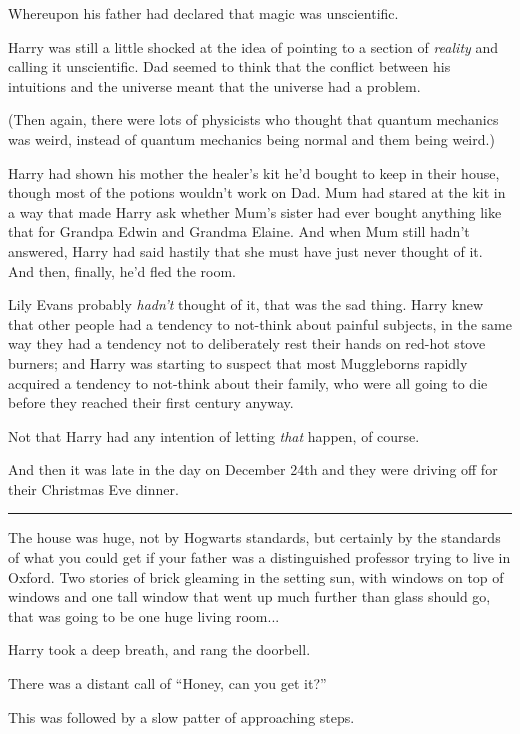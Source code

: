 Whereupon his father had declared that magic was unscientific.

Harry was still a little shocked at the idea of pointing to a section of \emph{reality} and calling it unscientific. Dad seemed to think that the conflict between his intuitions and the universe meant that the universe had a problem.

(Then again, there were lots of physicists who thought that quantum mechanics was weird, instead of quantum mechanics being normal and them being weird.)

Harry had shown his mother the healer's kit he'd bought to keep in their house, though most of the potions wouldn't work on Dad. Mum had stared at the kit in a way that made Harry ask whether Mum's sister had ever bought anything like that for Grandpa Edwin and Grandma Elaine. And when Mum still hadn't answered, Harry had said hastily that she must have just never thought of it. And then, finally, he'd fled the room.

Lily Evans probably \emph{hadn't} thought of it, that was the sad thing. Harry knew that other people had a tendency to not-think about painful subjects, in the same way they had a tendency not to deliberately rest their hands on red-hot stove burners; and Harry was starting to suspect that most Muggleborns rapidly acquired a tendency to not-think about their family, who were all going to die before they reached their first century anyway.

Not that Harry had any intention of letting \emph{that} happen, of course.

And then it was late in the day on December 24th and they were driving off for their Christmas Eve dinner.

\begin{center}\rule{3in}{0.4pt}\end{center}

The house was huge, not by Hogwarts standards, but certainly by the standards of what you could get if your father was a distinguished professor trying to live in Oxford. Two stories of brick gleaming in the setting sun, with windows on top of windows and one tall window that went up much further than glass should go, that was going to be one huge living room...

Harry took a deep breath, and rang the doorbell.

There was a distant call of ``Honey, can you get it?''

This was followed by a slow patter of approaching steps.

